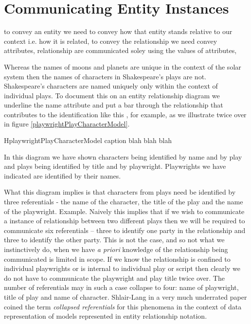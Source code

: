 \section{Communicating Entity Instances}
\label{CommunicatingEntityInstances}


\mynote to convey an entity we need to convey how that entity stands relative to our context i.e. how it is related,
to convey the relationship we need convey attributes,
 relationship are communicated soley using the values of attributes,

\mynote
Whereas the names of moons and planets are unique in the context of the solar system then the names of characters in Shakespeare's plays are not. Shakespeare's characters are named uniquely only within the context of individual plays. To document this on an entity relationship diagram we underline the name attribute and put a bar through the relationship that contributes to the identification like this \barkerEllisJ, for example, as we illustrate twice over in figure \ref{playwrightPlayCharacterModel}.


\begin{erboxedFigure} {H}{playwrightPlayCharacterModel}
{
caption blah blah blah
 }

\end{erboxedFigure}

In this diagram we have shown characters being identified by name and by play 
and plays being identified by title and by playwright. Playwrights we have indicated are identified by their names.

\mynote What this diagram implies is that characters from plays need be identified by three referentials - the name of the character, the title of the play and the name of the playwright.
Example.
\mynote Naively this implies that if we wish to communicate a instance of relationship between two different plays then we will be required to communicate six referentials
 -- three to identify one party in the relationship and three to identify the other party. This is not the case, and so not what we instinctively do, when we have \textit{a priori} knowledge of the relationship being communicated is limited in scope. If we know the relationship is confined to individual playwrights or is internal to individual play or script then clearly we do not have to communicate the playwright and play title twice over. The number of referentials may in such a case collapse to four: name of playwright, title of play and name of character.
Shlair-Lang in a very much underrated paper coined the term \textit{collapsed referentials} for this phenomena in the context of data representation of models represented in entity relationship notation.

